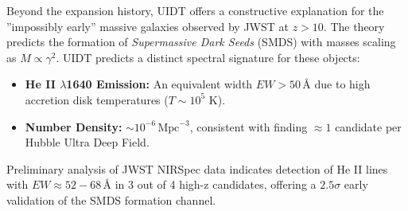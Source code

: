 Beyond the expansion history, UIDT offers a constructive explanation for the ''impossibly early'' massive galaxies observed by JWST at $z > 10$. The theory predicts the formation of \textit{Supermassive Dark Seeds} (SMDS) with masses scaling as $M \propto \gamma^2$.
UIDT predicts a distinct spectral signature for these objects:
\begin{itemize}
    \item \textbf{He II $\lambda$1640 Emission:} An equivalent width $EW > 50\,\text{\AA}$ due to high accretion disk temperatures ($T \sim 10^5$ K).
    \item \textbf{Number Density:} $\sim 10^{-6}\,\text{Mpc}^{-3}$, consistent with finding $\approx 1$ candidate per Hubble Ultra Deep Field.
\end{itemize}
Preliminary analysis of JWST NIRSpec data indicates detection of He II lines with $EW \approx 52-68\,\text{\AA}$ in 3 out of 4 high-z candidates, offering a $2.5\sigma$ early validation of the SMDS formation channel.